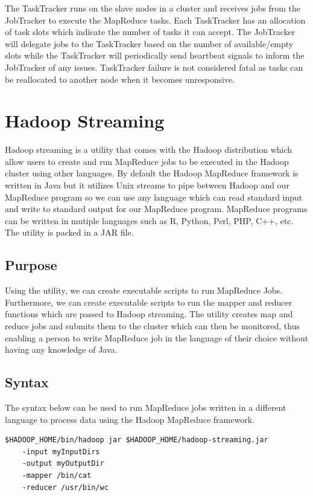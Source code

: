 \documentclass[11pt]{book}
\begin{document}
The TaskTracker runs on the slave nodes in a cluster and receives jobs from the JobTracker to execute the MapReduce tasks. Each TaskTracker has an allocation of task slots which indicate the number of tasks it can accept. The JobTracker will delegate jobs to the TaskTracker based on the number of available/empty slots while the TaskTracker will periodically send heartbeat signals to inform the JobTracker of any issues. TaskTracker failure is not considered fatal as tasks can be reallocated to another node when it becomes unresponsive.\\

\chapter{Hadoop Streaming}

Hadoop streaming is a utility that comes with the Hadoop distribution which allow users to create and run MapReduce jobs to be executed in the Hadoop cluster using other languages. By default the Hadoop MapReduce framework is written in Java but it utilizes Unix streams to pipe between Hadoop and our MapReduce program so we can use any language which can read standard input and write to standard output for our MapReduce program. MapReduce programs can be written in mutiple languages such as R, Python, Perl, PHP, C++, etc. The utility is packed in a JAR file. 

\section{Purpose}

Using the utility, we can create executable scripts to run MapReduce Jobs. Furthermore, we can create executable scripts to run the mapper and reducer functions which are passed to Hadoop streaming. The utility creates map and reduce jobs and submits them to the cluster which can then be monitored, thus enabling a person to write MapReduce job in the language of their choice without having any knowledge of Java.

\section{Syntax}

The syntax below can be used to run MapReduce jobs written in a different language to process data using the Hadoop MapReduce framework.\\

\begin{verbatim}
$HADOOP_HOME/bin/hadoop jar $HADOOP_HOME/hadoop-streaming.jar 
    -input myInputDirs 
    -output myOutputDir 
    -mapper /bin/cat 
    -reducer /usr/bin/wc
\end{verbatim}
\end{document}
